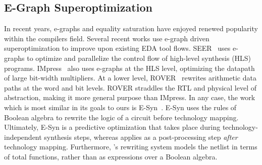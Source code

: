 \subsection{E-Graph Superoptimization}\label{sec:relatedwork:egraph}
In recent years, e-graphs and equality saturation have enjoyed renewed
popularity within the compilers field. Several recent works use e-graph driven
superoptimization to improve upon existing EDA tool flows. SEER~\cite{seer}
uses e-graphs to optimize and parallelize the control flow of high-level
synthesis (HLS) programs. IMpress~\cite{impress} also uses e-graphs at the HLS
level, optimizing the datapath of large bit-width multipliers. At a lower
level, ROVER~\cite{rover,roverbl,egraphconstraints} rewrites arithmetic data
paths at the word and bit levels. ROVER straddles the RTL and physical level of
abstraction, making it more general purpose than IMpress. In any case, the work
which is most similar in its goals to ours is E-Syn~\cite{esynth}. E-Syn uses
the rules of Boolean algebra to rewrite the logic of a circuit before
technology mapping. Ultimately, E-Syn is a predictive optimization that takes
place during technology-independent synthesis steps, whereas \shortname{}
applies as a post-processing step \textit{after} technology mapping.
Furthermore, \shortname{}'s rewriting system models the netlist in terms of
total functions, rather than as expressions over a Boolean algebra.